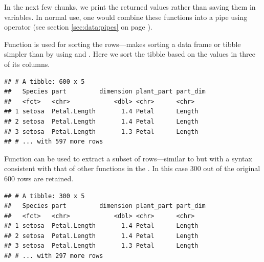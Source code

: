 \documentclass[krantz2]{krantz}\usepackage{knitr}
\begin{document}
In the next few chunks, we print the returned values rather than saving them in variables. In normal use, one would combine these functions into a pipe using operator  (see section \ref{sec:data:pipes} on page \pageref{sec:data:pipes}).

Function  is used for sorting the rows---makes sorting a data frame or tibble simpler than by using  and . Here we sort the tibble  based on the values in three of its columns.

\begin{knitrout}\footnotesize
{}\color{fgcolor}\begin{kframe}
\begin{alltt}
\end{alltt}
\begin{verbatim}
## # A tibble: 600 x 5
##   Species part         dimension plant_part part_dim
##   <fct>   <chr>            <dbl> <chr>      <chr>   
## 1 setosa  Petal.Length       1.4 Petal      Length  
## 2 setosa  Petal.Length       1.4 Petal      Length  
## 3 setosa  Petal.Length       1.3 Petal      Length  
## # ... with 597 more rows
\end{verbatim}
\end{kframe}
\end{knitrout}

Function  can be used to extract a subset of rows---similar to  but with a syntax consistent with that of other functions in the . In this case 300 out of the original 600 rows are retained.

\begin{knitrout}\footnotesize
{}\color{fgcolor}\begin{kframe}
\begin{alltt}
 \hlopt{==} \hlstd{)}
\end{alltt}
\begin{verbatim}
## # A tibble: 300 x 5
##   Species part         dimension plant_part part_dim
##   <fct>   <chr>            <dbl> <chr>      <chr>   
## 1 setosa  Petal.Length       1.4 Petal      Length  
## 2 setosa  Petal.Length       1.4 Petal      Length  
## 3 setosa  Petal.Length       1.3 Petal      Length  
## # ... with 297 more rows
\end{verbatim}
\end{kframe}
\end{knitrout}
\end{document}
